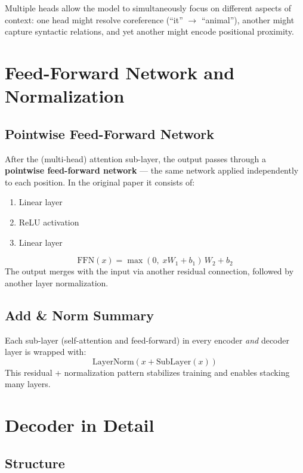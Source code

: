 \documentclass[11pt,a4paper]{article}
\theoremstyle{definition}
\theoremstyle{plain}
\theoremstyle{remark}
\begin{document}
\begin{tcolorbox}[colback=green!5!white,colframe=green!60!black,title=\textbf{Why Multi-Head?}]
Multiple heads allow the model to simultaneously focus on different aspects of context: one head might resolve coreference (``it'' $\to$ ``animal''), another might capture syntactic relations, and yet another might encode positional proximity.
\end{tcolorbox}


\section{Feed-Forward Network and Normalization}

\subsection{Pointwise Feed-Forward Network}

After the (multi-head) attention sub-layer, the output passes through a \textbf{pointwise feed-forward network} --- the same network applied independently to each position. In the original paper it consists of:
\begin{enumerate}
    \item Linear layer
    \item ReLU activation
    \item Linear layer
\end{enumerate}
\[
    \mathrm{FFN}(x) = \max(0,\; x W_1 + b_1)\, W_2 + b_2
\]
The output merges with the input via another residual connection, followed by another layer normalization.

\subsection{Add \& Norm Summary}

Each sub-layer (self-attention and feed-forward) in every encoder \emph{and} decoder layer is wrapped with:
\[
    \mathrm{LayerNorm}(x + \mathrm{SubLayer}(x))
\]
This residual + normalization pattern stabilizes training and enables stacking many layers.


\section{Decoder in Detail}

\subsection{Structure}
\end{document}
